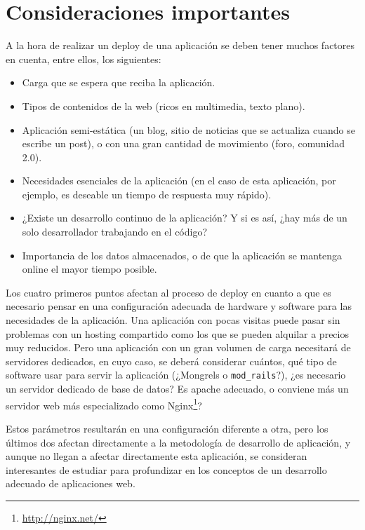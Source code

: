 \section{Consideraciones importantes} %
\label{sec:consideraciones_importantes}
A la hora de realizar un deploy de una aplicación se deben tener muchos factores en cuenta, entre ellos, los siguientes:

\begin{itemize}
	\item Carga que se espera que reciba la aplicación.
	\item Tipos de contenidos de la web (ricos en multimedia, texto plano).
	\item Aplicación semi-estática (un blog, sitio de noticias que se actualiza cuando se escribe un post), o con una gran cantidad de movimiento (foro, comunidad 2.0).
	\item Necesidades esenciales de la aplicación (en el caso de esta aplicación, por ejemplo, es deseable un tiempo de respuesta muy rápido).
	\item ¿Existe un desarrollo continuo de la aplicación? Y si es así, ¿hay más de un solo desarrollador trabajando en el código?
	\item Importancia de los datos almacenados, o de que la aplicación se mantenga online el mayor tiempo posible.
\end{itemize}

Los cuatro primeros puntos afectan al proceso de deploy en cuanto a que es necesario pensar en una configuración adecuada de hardware y software para las necesidades de la aplicación. Una aplicación con pocas visitas puede pasar sin problemas con un hosting compartido como los que se pueden alquilar a precios muy reducidos. Pero una aplicación con un gran volumen de carga necesitará de servidores dedicados, en cuyo caso, se deberá considerar cuántos, qué tipo de software usar para servir la aplicación (¿Mongrels o \texttt{mod\_rails}?), ¿es necesario un servidor dedicado de base de datos? Es apache adecuado, o conviene más un servidor web más especializado como Nginx\footnote{\url{http://nginx.net/}}?

Estos parámetros resultarán en una configuración diferente a otra, pero los últimos dos afectan directamente a la metodología de desarrollo de aplicación, y aunque no llegan a afectar directamente esta aplicación, se consideran interesantes de estudiar para profundizar en los conceptos de un desarrollo adecuado de aplicaciones web.

